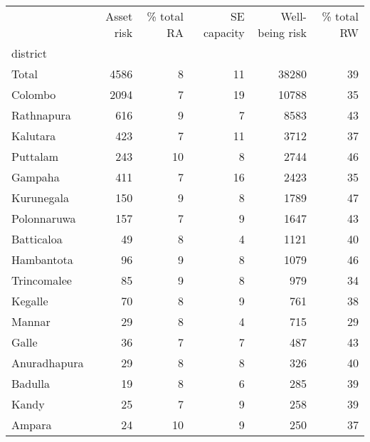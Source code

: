 \begin{tabular}{lrrrrr}
\toprule
{} &  Asset risk &  \% total RA &  SE capacity &  Well-being risk &  \% total RW \\
district     &             &             &              &                  &             \\
\midrule
Total        &        4586 &           8 &           11 &            38280 &          39 \\
Colombo      &        2094 &           7 &           19 &            10788 &          35 \\
Rathnapura   &         616 &           9 &            7 &             8583 &          43 \\
Kalutara     &         423 &           7 &           11 &             3712 &          37 \\
Puttalam     &         243 &          10 &            8 &             2744 &          46 \\
Gampaha      &         411 &           7 &           16 &             2423 &          35 \\
Kurunegala   &         150 &           9 &            8 &             1789 &          47 \\
Polonnaruwa  &         157 &           7 &            9 &             1647 &          43 \\
Batticaloa   &          49 &           8 &            4 &             1121 &          40 \\
Hambantota   &          96 &           9 &            8 &             1079 &          46 \\
Trincomalee  &          85 &           9 &            8 &              979 &          34 \\
Kegalle      &          70 &           8 &            9 &              761 &          38 \\
Mannar       &          29 &           8 &            4 &              715 &          29 \\
Galle        &          36 &           7 &            7 &              487 &          43 \\
Anuradhapura &          29 &           8 &            8 &              326 &          40 \\
Badulla      &          19 &           8 &            6 &              285 &          39 \\
Kandy        &          25 &           7 &            9 &              258 &          39 \\
Ampara       &          24 &          10 &            9 &              250 &          37 \\

\end{tabular}
